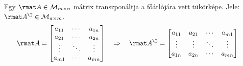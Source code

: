 \documentclass[a4paper, 12pt]{scrartcl}
\begin{document}
\begin{definition}
  Egy $\rmat A \in \mathcal M_{m \times n}$ mátrix transzponáltja a főátlójára
  vett tükörképe. Jele: $\rmat A^\T \in \mathcal M_{n \times m}$.
  $$
    \rmat A = \begin{bmatrix}
      a_{11} & \cdots & a_{1n} \\
      a_{21} & \cdots & a_{2n} \\
      \vdots & \ddots & \vdots \\
      a_{m1} & \cdots & a_{mn}
    \end{bmatrix}
    \quad \Rightarrow \quad
    \rmat A^\T = \begin{bmatrix}
      a_{11} & a_{21} & \cdots & a_{m1} \\
      \vdots & \vdots & \ddots & \vdots \\
      a_{1n} & a_{2n} & \cdots & a_{mn}
    \end{bmatrix}
  $$
\end{definition}
\end{document}
